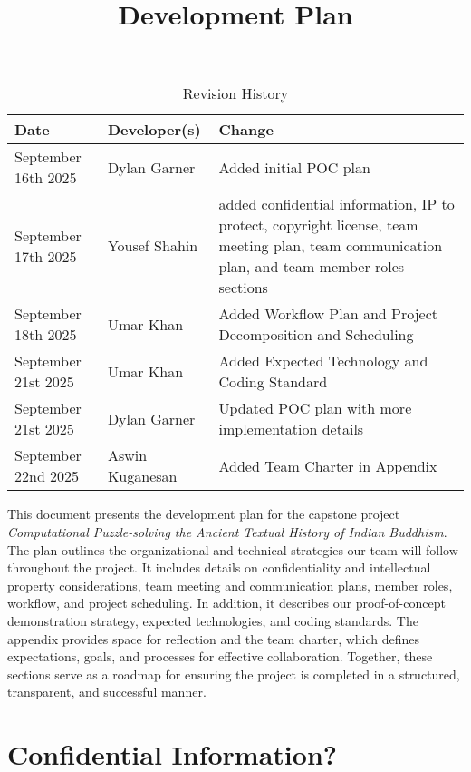 \documentclass{article}
\title{Development Plan\\\progname}
\author{\authname}
\date{}
\begin{document}
\maketitle

\begin{table}[hp]
\caption{Revision History} \label{TblRevisionHistory}
\begin{tabularx}{\textwidth}{llX}
\toprule
\textbf{Date} & \textbf{Developer(s)} & \textbf{Change}\\
\midrule
September 16th 2025 & Dylan Garner & Added initial POC plan\\
September 17th 2025 & Yousef Shahin & added confidential information, IP to protect, copyright license, team meeting plan, team communication plan, and team member roles sections\\
September 18th 2025 & Umar Khan & Added Workflow Plan and Project Decomposition and Scheduling\\
September 21st 2025 & Umar Khan & Added Expected Technology and Coding Standard \\
September 21st 2025 & Dylan Garner & Updated POC plan with more implementation details\\
September 22nd 2025 & Aswin Kuganesan & Added Team Charter in Appendix\\

\bottomrule
\end{tabularx}
\end{table}

\newpage{}

This document presents the development plan for the capstone project
\textit{Computational Puzzle-solving the Ancient Textual History of Indian Buddhism}.
The plan outlines the organizational and technical strategies our team will follow
throughout the project. It includes details on confidentiality and intellectual
property considerations, team meeting and communication plans, member roles, workflow,
and project scheduling. In addition, it describes our proof-of-concept demonstration
strategy, expected technologies, and coding standards. The appendix provides space
for reflection and the team charter, which defines expectations, goals, and processes
for effective collaboration. Together, these sections serve as a roadmap for ensuring
the project is completed in a structured, transparent, and successful manner.

\section{Confidential Information?}
\end{document}
